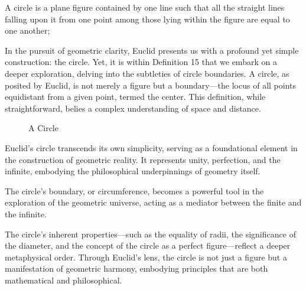 
\begin{defin}
A circle is a plane figure contained by one line such that all the straight lines falling upon it from one point among those lying within the figure are equal to one another;
\end{defin}

In the pursuit of geometric clarity, Euclid presents us with a profound yet simple construction: the circle. Yet, it is within Definition 15 that we embark on a deeper exploration, delving into the subtleties of circle boundaries. A circle, as posited by Euclid, is not merely a figure but a boundary—the locus of all points equidistant from a given point, termed the center. This definition, while straightforward, belies a complex understanding of space and distance.

\begin{figure}[h]
\centering
{}
\caption{A Circle}
\end{figure}

Euclid's circle transcends its own simplicity, serving as a foundational element in the construction of geometric reality. It represents unity, perfection, and the infinite, embodying the philosophical underpinnings of geometry itself. 

\clearpage

The circle's boundary, or circumference, becomes a powerful tool in the exploration of the geometric universe, acting as a mediator between the finite and the infinite.

The circle's inherent properties—such as the equality of radii, the significance of the diameter, and the concept of the circle as a perfect figure—reflect a deeper metaphysical order. Through Euclid's lens, the circle is not just a figure but a manifestation of geometric harmony, embodying principles that are both mathematical and philosophical.